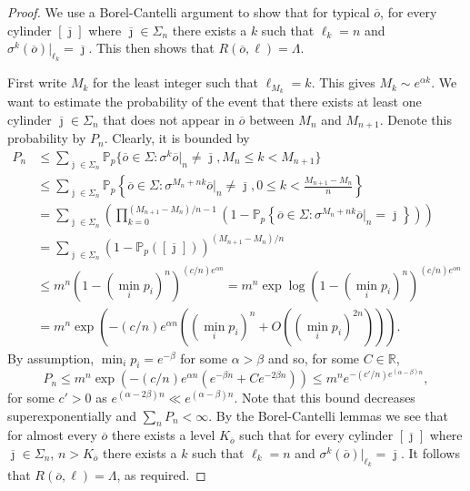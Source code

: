 \documentclass[12pt,]{article}
\theoremstyle{definition}
\theoremstyle{remark}
\renewcommand{\Bbb}[1]{\mathbb{#1}}
\newcommand{\bbP}{{\Bbb P}}
\newcommand{\0}{\mathbf{0}}
\newcommand{\bj}{{\overline  {\jmath}}}
\newcommand{\bo}{{\overline o}}
\begin{document}
\begin{proof}
  We use a Borel-Cantelli argument to show that for typical $\bo$, for every cylinder $[\bj]$ where
  $\bj\in\Sigma_n$ there exists a $k$ such that $\ell_k = n$ and $\sigma^k(\bo)|_{\ell_k}=\bj$. This then
  shows that $R(\bo, \ell) = \Lambda$.

  First write $M_k$ for the least integer such that $\ell_{M_k}=k$. This gives $M_k \sim e^{\alpha k}$.
  We want to estimate the probability of the event that there exists at least one cylinder $\bj\in\Sigma_n$ that
  does not appear in $\bo$ between $M_n$ and $M_{n+1}$. Denote this probability by $P_n$. Clearly, it is bounded by
  \begin{align*}
    P_n
    &\leq \sum_{\bj\in\Sigma_n}\bbP_p\{\bo\in\Sigma : \sigma^k\bo|_{n}\neq \bj, M_n\leq k <
    M_{n+1}\}\\
    &\leq \sum_{\bj\in\Sigma_n}\bbP_p\left\{\bo\in\Sigma : \sigma^{M_n+nk}\bo|_{n}\neq \bj, 0\leq k
    <\frac{M_{n+1}-M_n}{n}\right\}\\
    &=\sum_{\bj\in\Sigma_n}\left( \prod_{k=0}^{(M_{n+1}-M_n)/n-1} \left(1-\bbP_p\left\{\bo\in\Sigma :
    \sigma^{M_n+nk}\bo|_{n}= \bj\right\} \right)\right)\\
    &=\sum_{\bj\in\Sigma_n}\left( 1-\bbP_p([\bj]) \right)^{(M_{n+1}-M_n)/n}\\
    &\leq m^n \left( 1-(\min_i p_i)^n \right)^{(c/n) e^{\alpha n}}
    =m^n \exp\log\left( 1-(\min_i p_i)^n \right)^{(c/n) e^{\alpha n}}\\
    &=m^n \exp \left(-(c/n)e^{\alpha n}((\min_i p_i)^n+O((\min_i p_i)^{2n}))\right).
  \end{align*}
  By assumption, $\min_i p_i = e^{-\beta}$ for some $\alpha>\beta$ and so, for some $C\in\mathbb R$,
  \[
    P_n \leq m^n \exp\left(-(c/n)e^{\alpha n}(e^{-\beta n}+C e^{-2\beta n})\right)
    \leq m^n e^{-(c'/n)e^{(\alpha-\beta)n}},
  \]
  for some $c'>0$ as $e^{(\alpha-2\beta)n}\ll e^{(\alpha-\beta)n}$.
  Note that this bound decreases superexponentially and $\sum_n P_n < \infty$. By the Borel-Cantelli
  lemmas we see that for almost every $\bo$ there exists a level $K_{\bo}$ such that for every cylinder $[\bj]$ where
  $\bj\in\Sigma_n$, $n>K_{\bo}$ there exists a $k$ such that $\ell_k = n$ and
  $\sigma^k(\bo)|_{\ell_k}=\bj$. It follows that $R(\bo, \ell)=\Lambda$, as required.
\end{proof}
\end{document}
